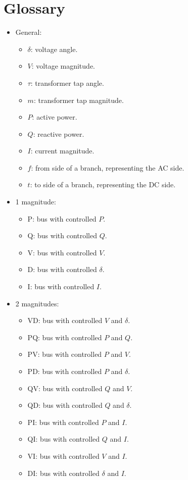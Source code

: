 \documentclass[11pt]{article}
\begin{document}
	\section{Glossary}
	\begin{itemize}
		\item General:
		\begin{itemize}
		\item $\delta$: voltage angle.
		\item $V$: voltage magnitude.
		\item $\tau$: transformer tap angle.
		\item $m$: transformer tap magnitude.
		\item $P$: active power.
		\item $Q$: reactive power.
		\item $I$: current magnitude.
		\item $f$: from side of a branch, representing the AC side.
		\item $t$: to side of a branch, representing the DC side.
		\end{itemize}
		\item 1 magnitude:
		\begin{itemize}
			\item P: bus with controlled $P$.
			\item Q: bus with controlled $Q$.
			\item V: bus with controlled $V$.
			\item D: bus with controlled $\delta$.
			\item I: bus with controlled $I$.
		\end{itemize}
		\item 2 magnitudes:
		\begin{itemize}
			\item VD: bus with controlled $V$ and $\delta$.
			\item PQ: bus with controlled $P$ and $Q$.
			\item PV: bus with controlled $P$ and $V$.
			\item PD: bus with controlled $P$ and $\delta$.
			\item QV: bus with controlled $Q$ and $V$.
			\item QD: bus with controlled $Q$ and $\delta$.
			\item PI: bus with controlled $P$ and $I$.
			\item QI: bus with controlled $Q$ and $I$.
			\item VI: bus with controlled $V$ and $I$.
			\item DI: bus with controlled $\delta$ and $I$. 

\end{itemize}
\end{itemize}
\end{document}
